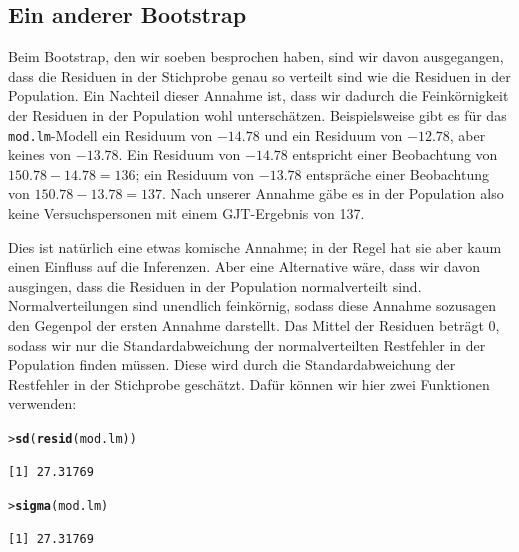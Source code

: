 \documentclass[oneside, 10pt]{book}\usepackage[]{graphicx}\usepackage[]{xcolor}
\makeatletter
\newcommand{\hlstd}[1]{\textcolor[rgb]{0.345,0.345,0.345}{#1}}%
\newcommand{\hlkwd}[1]{\textcolor[rgb]{0.737,0.353,0.396}{\textbf{#1}}}%
\newenvironment{kframe}{%
 \def\at@end@of@kframe{}%
 \ifinner\ifhmode%
  \def\at@end@of@kframe{\end{minipage}}%
  \begin{minipage}{\columnwidth}%
 \fi\fi%
 \def\FrameCommand##1{\hskip\@totalleftmargin \hskip-\fboxsep
 \colorbox{shadecolor}{##1}\hskip-\fboxsep
     \hskip-\linewidth \hskip-\@totalleftmargin \hskip\columnwidth}%
 \MakeFramed {\advance\hsize-\width
   \@totalleftmargin\z@ \linewidth\hsize
   \@setminipage}}%
 {\par\unskip\endMakeFramed%
 \at@end@of@kframe}
\newenvironment{knitrout}{}{} %
\makeatother
\begin{document}
\subsection{Ein anderer Bootstrap}\label{semiparametricbootstrap}
Beim Bootstrap, den wir soeben besprochen haben,
sind wir davon ausgegangen, dass die Residuen
in der Stichprobe genau so verteilt sind wie die
Residuen in der Population. Ein Nachteil dieser
Annahme ist, dass wir dadurch die Feinkörnigkeit
der Residuen in der Population wohl unterschätzen.
Beispielsweise gibt es für das \texttt{mod.lm}-Modell
ein Residuum von $-14.78$ und ein Residuum von
$-12.78$, aber keines von $-13.78$.
Ein Residuum von $-14.78$ entspricht einer Beobachtung
von $150.78 - 14.78 = 136$; ein Residuum von $-13.78$
entspräche einer Beobachtung von $150.78 - 13.78 = 137$.
Nach unserer Annahme gäbe es in der Population also
keine Versuchspersonen mit einem GJT-Ergebnis von 137.

Dies ist natürlich eine etwas komische Annahme;
in der Regel hat sie aber kaum einen Einfluss auf die
Inferenzen. Aber eine Alternative wäre,
dass wir davon ausgingen, dass die Residuen in
der Population normalverteilt sind. Normalverteilungen
sind unendlich feinkörnig, sodass diese Annahme sozusagen
den Gegenpol der ersten Annahme darstellt.
Das Mittel der Residuen beträgt 0, sodass
wir nur die Standardabweichung der normalverteilten Restfehler
in der Population
finden müssen. Diese wird durch die Standardabweichung
der Restfehler in der Stichprobe geschätzt.
Dafür können wir hier zwei Funktionen verwenden:

\begin{knitrout}
\color{fgcolor}\begin{kframe}
\begin{alltt}
\hlstd{> }\hlkwd{sd}\hlstd{(}\hlkwd{resid}\hlstd{(mod.lm))}
\end{alltt}
\begin{verbatim}
[1] 27.31769
\end{verbatim}
\begin{alltt}
\hlstd{> }\hlkwd{sigma}\hlstd{(mod.lm)}
\end{alltt}
\begin{verbatim}
[1] 27.31769
\end{verbatim}
\end{kframe}
\end{knitrout}
\end{document}
